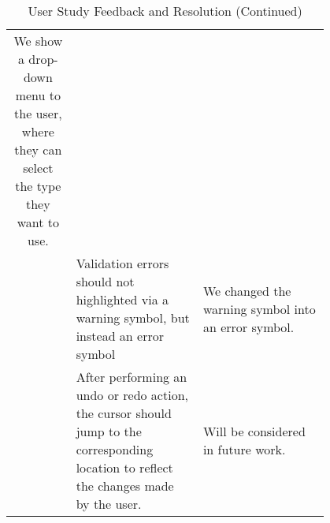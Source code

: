 \begin{table*}
\begin{tabular}{|c|p{0.4\linewidth}|p{0.4\linewidth}|}
        We show a drop-down menu to the user, where they can select the type they want to use. \\
        \cline{2-3}
        & Validation errors should not highlighted via a warning symbol, but instead an error symbol & 
        We changed the warning symbol into an error symbol. \\
        \cline{2-3}
        & After performing an undo or redo action, the cursor should jump to the corresponding location to reflect the changes made by the user.& 
        Will be considered in future work. \\
        \hline
    \end{tabular}
    \caption* {User Study Feedback and Resolution (Continued)} \label{tab:user_study1}
\end{table*}


\clearpage %

